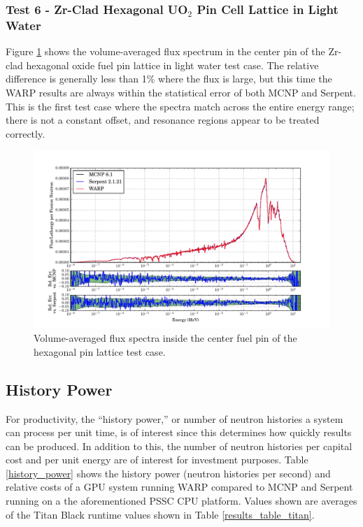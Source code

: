 \documentclass[preprint,12pt]{elsarticle}
\begin{document}
\newpage
\subsubsection{Test 6 - Zr-Clad Hexagonal UO$_2$ Pin Cell Lattice in Light Water}

Figure \ref{assembly-lw_spec} shows the volume-averaged flux spectrum in the center pin of the Zr-clad hexagonal oxide fuel pin lattice in light water test case. The relative difference is generally less than 1\% where the flux is large, but this time the WARP results are always within the statistical error of both MCNP and Serpent. This is the first test case where the spectra match across the entire energy range; there is not a constant offset, and resonance regions appear to be treated correctly.  

\begin{figure}[h!]
\centering
\includegraphics[width=\textwidth,trim= 1cm 0cm 1cm 0cm]{graphics/assembly-lw_spec.pdf}
\caption{Volume-averaged flux spectra inside the center fuel pin of the hexagonal pin lattice test case. \label{assembly-lw_spec} }
\end{figure}

\newpage
\subsection{History Power}

For productivity, the ``history power,'' or  number of neutron histories a system can process per unit time, is of interest since this determines how quickly results can be produced.  In addition to this, the number of neutron histories per capital cost and per unit energy are of interest for investment purposes.  Table \ref{history_power} shows the history power (neutron histories per second) and relative costs of a GPU system running WARP compared to MCNP and Serpent running on a the aforementioned PSSC CPU platform.  Values shown are averages of the Titan Black runtime values shown in Table \ref{results_table_titan}.
\end{document}
